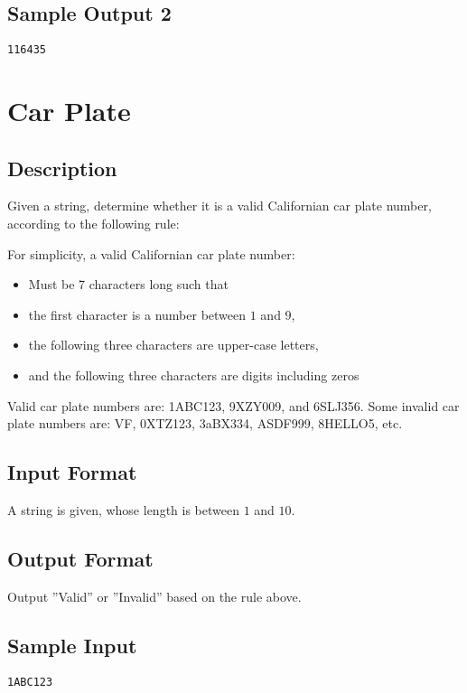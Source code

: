 \subsection*{Sample Output 2}
\begin{verbatim}
116435
\end{verbatim}

\newpage

\section{Car Plate}

\subsection*{Description}
Given a string, determine whether it is a valid Californian car plate number, according to the following rule:

For simplicity, a valid Californian car plate number:
\begin{itemize}
  \item Must be 7 characters long such that 
  \item the first character is a number between $1$ and $9$,
  \item the following three characters are upper-case letters,
  \item and the following three characters are digits including zeros
\end{itemize}

Valid car plate numbers are: 1ABC123, 9XZY009, and 6SLJ356.
Some invalid car plate numbers are: VF, 0XTZ123, 3aBX334, ASDF999, 8HELLO5, etc.


\subsection*{Input Format}
A string is given, whose length is between $1$ and $10$. 

\subsection*{Output Format}
Output ''Valid'' or ''Invalid'' based on the rule above.

\subsection*{Sample Input}
\begin{verbatim}
1ABC123
\end{verbatim}

